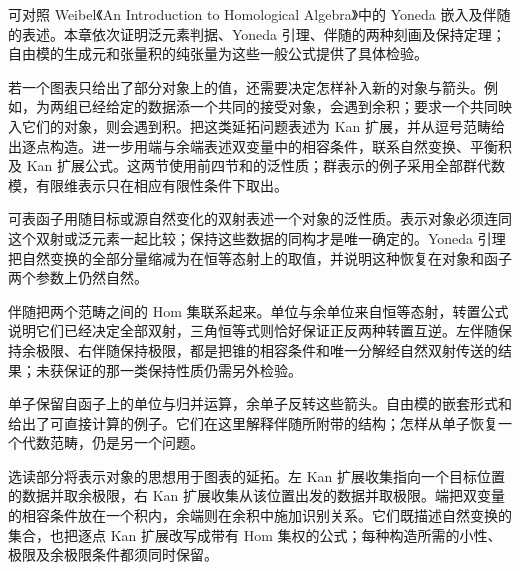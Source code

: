 \ProseParagraphBreak
可对照 Weibel《An Introduction to Homological Algebra》中的 Yoneda 嵌入\cite[Example A.3.4]{Weibel1994HomologicalAlgebra}及伴随的表述\cite[A.6.1; Theorem A.6.2]{Weibel1994HomologicalAlgebra}。本章依次证明泛元素判据、Yoneda 引理、伴随的两种刻画及保持定理；自由模的生成元和张量积的纯张量为这些一般公式提供了具体检验。

\ProseParagraphBreak
若一个图表只给出了部分对象上的值，还需要决定怎样补入新的对象与箭头。例如，为两组已经给定的数据添一个共同的接受对象，会遇到余积；要求一个共同映入它们的对象，则会遇到积。把这类延拓问题表述为 Kan 扩展，并从逗号范畴给出逐点构造。进一步用端与余端表述双变量中的相容条件，联系自然变换、平衡积及 Kan 扩展公式。这两节使用前四节和的泛性质；群表示的例子采用全部群代数模，有限维表示只在相应有限性条件下取出。










\begin{chaptersummary}
	可表函子用随目标或源自然变化的双射表述一个对象的泛性质。表示对象必须连同这个双射或泛元素一起比较；保持这些数据的同构才是唯一确定的。Yoneda 引理把自然变换的全部分量缩减为在恒等态射上的取值，并说明这种恢复在对象和函子两个参数上仍然自然。

	\ProseParagraphBreak
	伴随把两个范畴之间的 Hom 集联系起来。单位与余单位来自恒等态射，转置公式说明它们已经决定全部双射，三角恒等式则恰好保证正反两种转置互逆。左伴随保持余极限、右伴随保持极限，都是把锥的相容条件和唯一分解经自然双射传送的结果；未获保证的那一类保持性质仍需另外检验。

	\ProseParagraphBreak
	单子保留自函子上的单位与归并运算，余单子反转这些箭头。自由模的嵌套形式和给出了可直接计算的例子。它们在这里解释伴随所附带的结构；怎样从单子恢复一个代数范畴，仍是另一个问题。

	\ProseParagraphBreak
	选读部分将表示对象的思想用于图表的延拓。左 Kan 扩展收集指向一个目标位置的数据并取余极限，右 Kan 扩展收集从该位置出发的数据并取极限。端把双变量的相容条件放在一个积内，余端则在余积中施加识别关系。它们既描述自然变换的集合，也把逐点 Kan 扩展改写成带有 Hom 集权的公式；每种构造所需的小性、极限及余极限条件都须同时保留。
\end{chaptersummary}

\BookExercises

